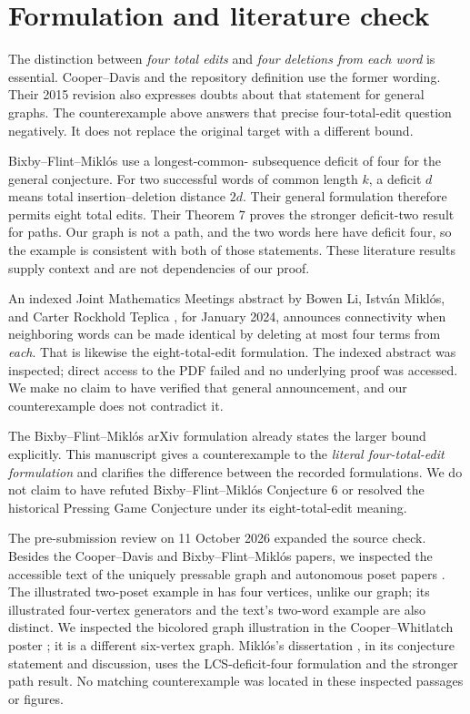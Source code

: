 \documentclass[11pt]{article}
\begin{document}
\section{Formulation and literature check}
The distinction between \emph{four total edits} and \emph{four deletions
from each word} is essential. Cooper--Davis \cite[Conjecture 1]{cooper}
and the repository definition use the former wording. Their 2015 revision
also expresses doubts about that statement for general graphs. The
counterexample above answers that precise four-total-edit question
negatively. It does not replace the original target with a different bound.

Bixby--Flint--Mikl\'os \cite[Conjecture 6]{bixby} use a longest-common-
subsequence deficit of four for the general conjecture. For two successful
words of common length $k$, a deficit $d$ means total insertion--deletion
distance $2d$. Their general formulation therefore permits eight total
edits. Their Theorem 7 proves the stronger deficit-two result for paths.
Our graph is not a path, and the two words here have deficit four,
so the example is consistent with both of those statements. These
literature results supply context and are not dependencies of our proof.

An indexed Joint Mathematics Meetings abstract by Bowen Li, Istv\'an
Mikl\'os, and Carter Rockhold Teplica \cite{jmm}, for January 2024,
announces connectivity when neighboring words can be made identical
by deleting at most four terms from \emph{each}. That is likewise
the eight-total-edit formulation. The indexed abstract was inspected;
direct access to the PDF failed and no underlying proof was accessed.
We make no claim to have verified that general announcement, and our
counterexample does not contradict it.

The Bixby--Flint--Mikl\'os arXiv formulation already states the
larger bound explicitly. This manuscript gives a counterexample to
the \emph{literal four-total-edit formulation} and clarifies
the difference between the recorded formulations. We do not claim to have
refuted Bixby--Flint--Mikl\'os Conjecture 6 or resolved the historical
Pressing Game Conjecture under its eight-total-edit meaning.

The pre-submission review on 11 October 2026 expanded the source check.
Besides the Cooper--Davis and Bixby--Flint--Mikl\'os papers, we inspected
the accessible text of the uniquely pressable graph and autonomous poset
papers \cite{unique,vposets}. The illustrated two-poset example in
\cite[Figure 2]{vposets} has four vertices, unlike our graph; its illustrated
four-vertex generators and the text's two-word example are also distinct.
We inspected the bicolored graph illustration in the Cooper--Whitlatch
poster \cite{poster}; it is a different six-vertex graph. Mikl\'os's
dissertation \cite[Chapter 9, pp.~167--178]{miklosthesis}, in its
conjecture statement and discussion, uses the LCS-deficit-four formulation
and the stronger path result. No matching counterexample was located in
these inspected passages or figures.
\end{document}
